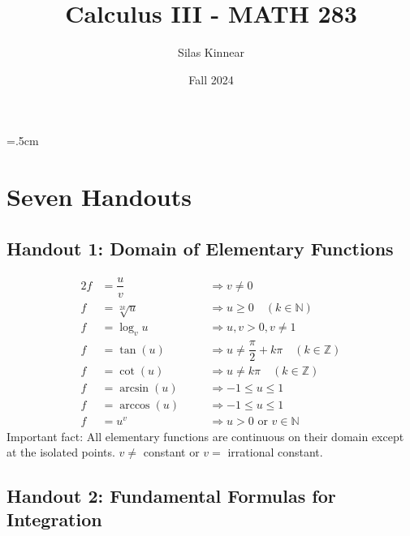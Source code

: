 \documentclass[a4paper,12pt,openany]{book}
\begin{document}
\title{Calculus III - MATH 283}
\author{Silas Kinnear}
\date{Fall 2024}
\maketitle

\tableofcontents
{}
\parskip=.5cm
\parindent=0cm




\chapter*{Seven Handouts}
\section{Handout 1: Domain of Elementary Functions}

\begin{alignat*}{2}
    f &= \dfrac{u}{v} &\quad &\Rightarrow v \neq 0 \\
    f &= \sqrt[2k]{u} &\quad &\Rightarrow u \geq 0 \quad (k \in \mathbb{N}) \\
    f &= \log_{v}{u} &\quad &\Rightarrow u, v > 0, v \neq 1 \\
    f &= \tan(u) &\quad &\Rightarrow u \neq \dfrac{\pi}{2} + k\pi \quad (k \in \mathbb{Z}) \\
    f &= \cot(u) &\quad &\Rightarrow u \neq k\pi \quad (k \in \mathbb{Z}) \\
    f &= \arcsin(u) &\quad &\Rightarrow -1 \leq u \leq 1 \\
    f &= \arccos(u) &\quad &\Rightarrow -1 \leq u \leq 1 \\
    f &= u^v &\quad &\Rightarrow u > 0 \text{ or } v \in \mathbb{N} 
\end{alignat*}
Important fact: All elementary functions are continuous on their domain except at the isolated points.
$v \neq $ constant or $v = $ irrational constant.

\section{Handout 2: Fundamental Formulas for Integration}
\end{document}
